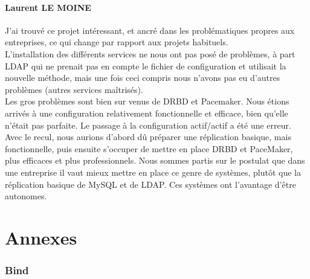 \documentclass[11pt,a4paper]{report}
\begin{document}
            \subsection{Laurent \textsc{LE MOINE}}
                
                J'ai trouv\'e ce projet int\'eressant, et ancr\'e dans les probl\'ematiques propres aux entreprises, ce qui change par rapport aux projets habituels.\\
                
                L'installation des diff\'erents services ne nous ont pas pos\'e de probl\`emes, \`a part LDAP qui ne prenait pas en compte le fichier de configuration et utilisait la nouvelle m\'ethode, mais une fois ceci compris nous n'avons pas eu d'autres probl\`emes (autres services ma\^itris\'es).\\
                
                Les gros probl\`emes sont bien sur venus de DRBD et Pacemaker. Nous \'etions arriv\'es \`a une configuration relativement fonctionnelle et efficace, bien qu'elle n'\'etait pas parfaite. Le passage \`a la configuration actif/actif a \'et\'e une erreur.\\
                
                Avec le recul, nous aurions d'abord d\^u pr\'eparer une r\'eplication basique, mais fonctionnelle, puis ensuite s'occuper de mettre en place DRBD et PaceMaker, plus efficaces et plus professionnels. Nous sommes partis sur le postulat que dans une entreprise il vaut mieux mettre en place ce genre de syst\`emes, plut\^ot que la r\'eplication basique de MySQL et de LDAP. Ces syst\`emes ont l'avantage d'\^etre autonomes.
                
                \vfill
                \flushleft{}
                
    \appendix
    
    \part{Annexes}
        
        \section{Bind} \label{bind}
            
\end{document}
